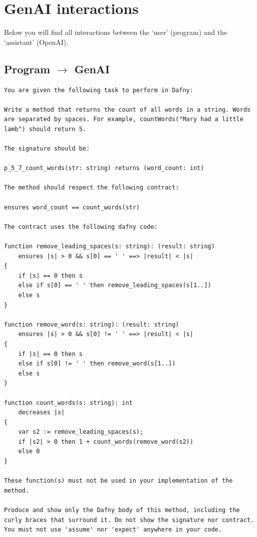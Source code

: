 \documentclass{article}
\begin{document}
\section*{GenAI interactions}
Below you will find all interactions between the `user' (program) and the `assistant' (OpenAI).
\subsection*{Program $\rightarrow$ GenAI}
\begin{lstlisting}
You are given the following task to perform in Dafny:

Write a method that returns the count of all words in a string. Words are separated by spaces. For example, countWords("Mary had a little lamb") should return 5.

The signature should be:

p_5_7_count_words(str: string) returns (word_count: int)

The method should respect the following contract:

ensures word_count == count_words(str)

The contract uses the following dafny code:

function remove_leading_spaces(s: string): (result: string)
    ensures |s| > 0 && s[0] == ' ' ==> |result| < |s|
{
    if |s| == 0 then s
    else if s[0] == ' ' then remove_leading_spaces(s[1..])
    else s
}

function remove_word(s: string): (result: string)
    ensures |s| > 0 && s[0] != ' ' ==> |result| < |s|
{
    if |s| == 0 then s
    else if s[0] != ' ' then remove_word(s[1..])
    else s
}

function count_words(s: string): int
    decreases |s|
{
    var s2 := remove_leading_spaces(s);
    if |s2| > 0 then 1 + count_words(remove_word(s2))
    else 0
}

These function(s) must not be used in your implementation of the method.

Produce and show only the Dafny body of this method, including the curly braces that surround it. Do not show the signature nor contract. You must not use 'assume' nor 'expect' anywhere in your code.
\end{lstlisting}
\end{document}

